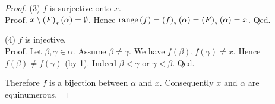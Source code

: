 \documentclass[../set-theory.tex]{subfiles}
\begin{document}
\begin{forthel}
\begin{proof}
      (3) $f$ is surjective onto $x$. \\
      Proof.
        $x \setminus \left(F\right)_{*}(\alpha) = \emptyset$.
        Hence $\mathrm{range}\left(f\right)
          = \left(f\right)_{*}(\alpha)
          = \left(F\right)_{*}(\alpha)
          = x$.
      Qed.

      (4) $f$ is injective. \\
      Proof.
        Let $\beta, \gamma \in \alpha$.
        Assume $\beta \neq \gamma$.
        We have $f(\beta), f(\gamma) \neq x$.
        Hence $f(\beta) \neq f(\gamma)$ (by 1).
        Indeed $\beta \less \gamma$ or $\gamma \less \beta$.
      Qed.

      Therefore $f$ is a bijection between $\alpha$ and $x$.
      Consequently $x$ and $\alpha$ are equinumerous.
    \end{proof}
  \end{forthel}
\end{document}
